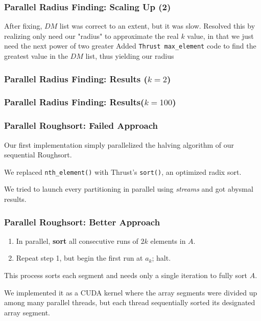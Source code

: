 \documentclass[10pt, xcolor={dvipsnames}, aspectratio=169]{beamer}
\begin{document}
\begin{frame}
	\frametitle{Parallel Radius Finding: Scaling Up (2)}
	After fixing, $DM$ list was correct to an extent, but it was slow.
	\newline\newline
	Resolved this by realizing only need our "radius" to approximate the real $k$ value, in that we just need the next power of two greater
	\newline\newline
	Added \texttt{Thrust max_element} code to find the greatest value in the $DM$ list, thus yielding our radius
\end{frame}

\begin{frame}
\frametitle{Parallel Radius Finding: Results ($k = 2$)}
\begin{figure}
\resizebox{!}{.8\textheight}{}
\end{figure}
\end{frame}

\begin{frame}
\frametitle{Parallel Radius Finding: Results($k = 100$)}
\begin{figure}
	\resizebox{!}{.8\textheight}{}
\end{figure}
\end{frame}

\begin{frame}
\frametitle{Parallel Roughsort: Failed Approach}
Our first implementation simply parallelized the halving algorithm of our sequential Roughsort. \newline

We replaced \texttt{nth_element()} with Thrust's \texttt{sort()}, an optimized radix sort. \newline

We tried to launch every partitioning in parallel using \textit{streams} and got abysmal results.
\end{frame}

\begin{frame}
\frametitle{Parallel Roughsort: Better Approach}
\begin{enumerate}\setlength{\itemsep}{0pt}\setlength{\parskip}{0pt}
\item In parallel, \textbf{sort} all consecutive runs of $2k$ elements in $A$.
\item Repeat step 1, but begin the first run at $a_k$; halt.
\end{enumerate}
This process sorts each segment and needs only a single iteration to fully sort $A$. \newline

We implemented it as a CUDA kernel where the array segments were divided up among many parallel threads,
  but each thread sequentially sorted its designated array segment.
\end{frame}
\end{document}
